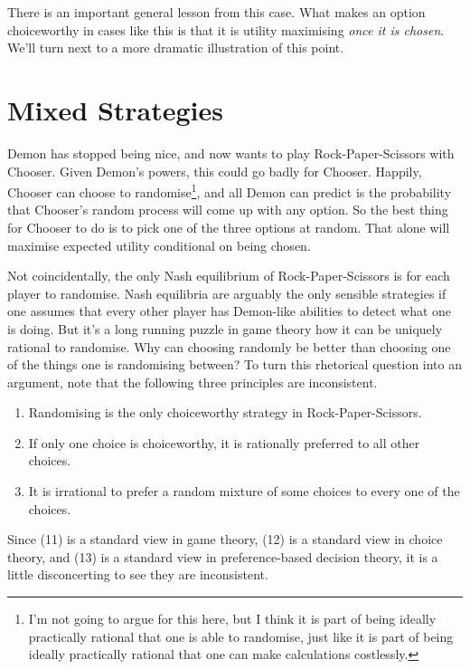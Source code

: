 \documentclass[
  11pt,
  letterpaper,
  DIV=11,
  numbers=noendperiod,
  twoside]{scrartcl}
\providecommand{\tightlist}{%
  \setlength{\itemsep}{0pt}\setlength{\parskip}{0pt}}
\begin{document}
There is an important general lesson from this case. What makes an
option choiceworthy in cases like this is that it is utility maximising
\emph{once it is chosen}. We'll turn next to a more dramatic
illustration of this point.

\section{Mixed Strategies}\label{sec-mixed}

Demon has stopped being nice, and now wants to play Rock-Paper-Scissors
with Chooser. Given Demon's powers, this could go badly for Chooser.
Happily, Chooser can choose to randomise\footnote{I'm not going to argue
  for this here, but I think it is part of being ideally practically
  rational that one is able to randomise, just like it is part of being
  ideally practically rational that one can make calculations
  costlessly.}, and all Demon can predict is the probability that
Chooser's random process will come up with any option. So the best thing
for Chooser to do is to pick one of the three options at random. That
alone will maximise expected utility conditional on being chosen.

Not coincidentally, the only Nash equilibrium of Rock-Paper-Scissors is
for each player to randomise. Nash equilibria are arguably the only
sensible strategies if one assumes that every other player has
Demon-like abilities to detect what one is doing. But it's a long
running puzzle in game theory how it can be uniquely rational to
randomise. Why can choosing randomly be better than choosing one of the
things one is randomising between? To turn this rhetorical question into
an argument, note that the following three principles are inconsistent.

\begin{enumerate}
\def\labelenumi{(\arabic{enumi})}
\setcounter{enumi}{10}
\tightlist
\item
  Randomising is the only choiceworthy strategy in Rock-Paper-Scissors.
\item
  If only one choice is choiceworthy, it is rationally preferred to all
  other choices.
\item
  It is irrational to prefer a random mixture of some choices to every
  one of the choices.
\end{enumerate}

Since (11) is a standard view in game theory, (12) is a standard view in
choice theory, and (13) is a standard view in preference-based decision
theory, it is a little disconcerting to see they are inconsistent.
\end{document}
